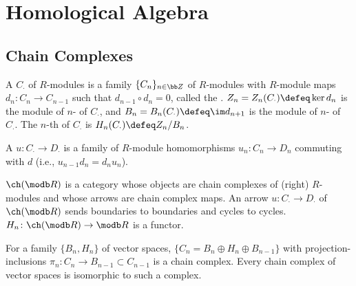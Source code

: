 \section{Homological Algebra}\cite{weibel}
\subsection{Chain Complexes}
A  $C_\cdot$ of $R$-modules is a family $\{ C_n \}_{n \in \bb Z}$ of $R$-modules with $R$-module maps $d_n \colon C_n \to C_{n-1}$ such that $d_{n-1} \circ d_{n} = 0$, called the . $Z_n = Z_n(C_\cdot) \defeq \ker d_n$ is the module of $n$- of $C_\cdot$, and $B_n = B_n(C_\cdot) \defeq \im d_{n+1}$ is the module of $n$- of $C_\cdot$. The $n$-th  of $C_\cdot$ is $H_n(C_\cdot) \defeq Z_n / B_n$.

A  $u \colon C_\cdot \to D_\cdot$ is a family of $R$-module homomorphisms $u_n \colon C_n \to D_n$ commuting with $d$ (i.e., $u_{n-1}d_n = d_n u_n$).

$\ch(\modb R)$ is a category whose objects are chain complexes of (right) $R$-modules and whose arrows are chain complex maps. An arrow $u \colon C_\cdot \to D_\cdot$ of $\ch(\modb R)$ sends boundaries to boundaries and cycles to cycles. $H_n \colon \ch(\modb R) \to \modb R$ is a functor.

For a family $\{ B_n, H_n \}$ of vector spaces, $\{ C_n = B_n \oplus H_n \oplus B_{n-1} \}$ with projection-inclusions $\pi_n \colon C_n \to B_{n-1} \subset C_{n-1}$ is a chain complex. Every chain complex of vector spaces is isomorphic to such a complex.

